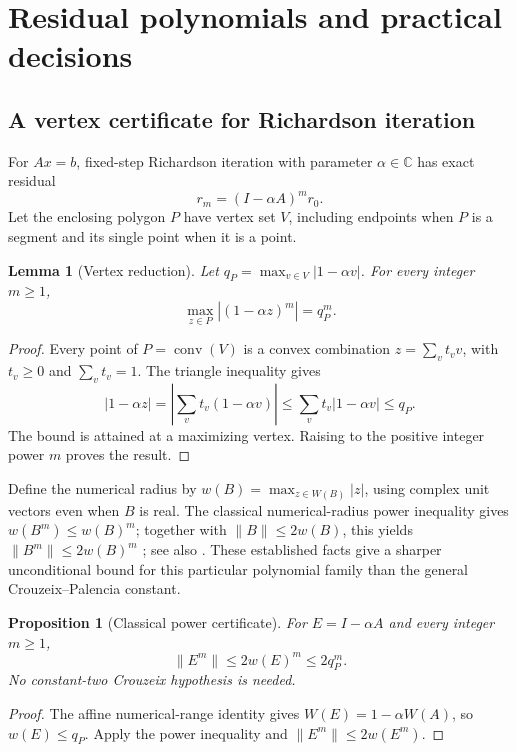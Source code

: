 \documentclass[11pt]{article}
\newcommand{\C}{\mathbb C}
\newcommand{\norm}[1]{\lVert #1\rVert}
\newcommand{\W}{W}
\DeclareMathOperator{\conv}{conv}
\newtheorem{proposition}[theorem]{Proposition}
\newtheorem{lemma}[theorem]{Lemma}
\theoremstyle{definition}
\theoremstyle{remark}
\numberwithin{equation}{section}
\begin{document}
\section{Residual polynomials and practical decisions}\label{sec:residuals}
\subsection{A vertex certificate for Richardson iteration}
For \(Ax=b\), fixed-step Richardson iteration with parameter
\(\alpha\in\C\) has exact residual
\[
 r_m=(I-\alpha A)^m r_0.
\]
Let the enclosing polygon \(P\) have vertex set \(V\), including endpoints
when \(P\) is a segment and its single point when it is a point.

\begin{lemma}[Vertex reduction]\label{lem:vertices}
Let
\(q_P=\max_{v\in V}|1-\alpha v|\).
For every integer \(m\ge1\),
\[
 \max_{z\in P}|(1-\alpha z)^m|=q_P^m.
\]
\end{lemma}
\begin{proof}
Every point of \(P=\conv(V)\) is a convex combination
\(z=\sum_v t_vv\), with \(t_v\ge0\) and \(\sum_vt_v=1\).
The triangle inequality gives
\[
 |1-\alpha z|
 =\left|\sum_vt_v(1-\alpha v)\right|
 \le\sum_vt_v|1-\alpha v|\le q_P.
\]
The bound is attained at a maximizing vertex.
Raising to the positive integer power \(m\) proves the result.
\end{proof}

Define the numerical radius by \(w(B)=\max_{z\in\W(B)}|z|\),
using complex unit vectors even when \(B\) is real.
The classical numerical-radius power inequality gives
\(w(B^m)\le w(B)^m\); together with \(\norm{B}\le2w(B)\), this yields
\(\norm{B^m}\le2w(B)^m\) \citep[Section~3.2]{Tadmor2025};
see also \citet[Eq.~(1.1)]{LewisOverton2020}.
These established facts give a sharper unconditional bound for this
particular polynomial family than the general Crouzeix--Palencia constant.

\begin{proposition}[Classical power certificate]\label{prop:power}
For \(E=I-\alpha A\) and every integer \(m\ge1\),
\[
 \norm{E^m}\le2w(E)^m\le2q_P^m.
\]
No constant-two Crouzeix hypothesis is needed.
\end{proposition}
\begin{proof}
The affine numerical-range identity gives
\(\W(E)=1-\alpha\W(A)\), so \(w(E)\le q_P\).
Apply the power inequality and \(\norm{E^m}\le2w(E^m)\).
\end{proof}
\end{document}
